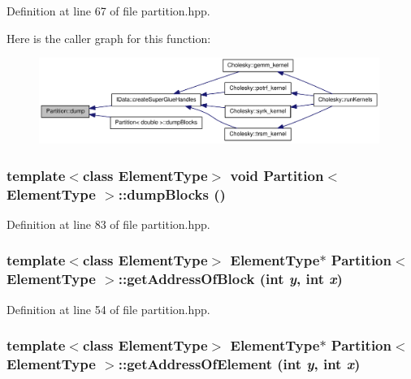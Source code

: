 Definition at line 67 of file partition.hpp.

Here is the caller graph for this function:\nopagebreak
\begin{figure}[H]
\begin{center}
\leavevmode
\includegraphics[width=314pt]{class_partition_aeabe76c45c274addb15c435f13c2c7e8_icgraph}
\end{center}
\end{figure}
\hypertarget{class_partition_a38087382dbb5c22edcd3671aa65d872b}{
\subsubsection[{dumpBlocks}]{\setlength{\rightskip}{0pt plus 5cm}template$<$class ElementType$>$ void {\bf Partition}$<$ ElementType $>$::dumpBlocks ()}}
\label{class_partition_a38087382dbb5c22edcd3671aa65d872b}


Definition at line 83 of file partition.hpp.\hypertarget{class_partition_a22be567d4a5505fa6134221000970704}{
\subsubsection[{getAddressOfBlock}]{\setlength{\rightskip}{0pt plus 5cm}template$<$class ElementType$>$ ElementType$\ast$ {\bf Partition}$<$ ElementType $>$::getAddressOfBlock (int {\em y}, \/  int {\em x})}}
\label{class_partition_a22be567d4a5505fa6134221000970704}


Definition at line 54 of file partition.hpp.\hypertarget{class_partition_a3866b3ab8d6e114eb0835465f7418ceb}{
\subsubsection[{getAddressOfElement}]{\setlength{\rightskip}{0pt plus 5cm}template$<$class ElementType$>$ ElementType$\ast$ {\bf Partition}$<$ ElementType $>$::getAddressOfElement (int {\em y}, \/  int {\em x})}}
\label{class_partition_a3866b3ab8d6e114eb0835465f7418ceb}


